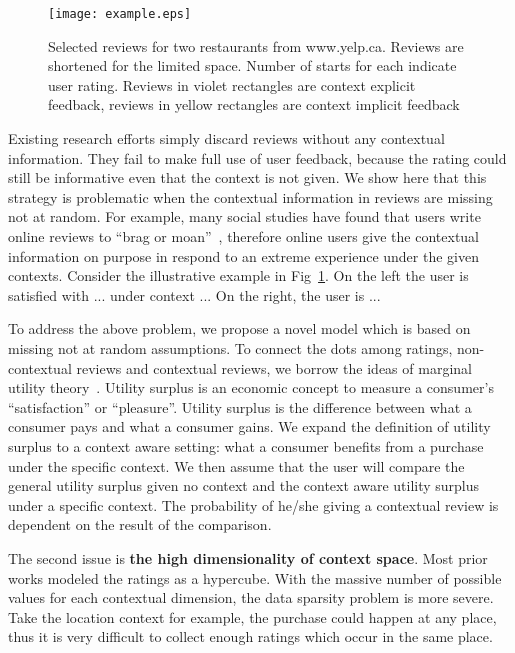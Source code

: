 \documentclass{llncs}
\begin{document}
\begin{figure}[!ht]
\label{fig:example}
\centering
\texttt{[image: example.eps]}
\caption{Selected reviews for two restaurants from www.yelp.ca. Reviews are shortened for the limited space. Number of starts for each indicate user rating. Reviews in violet rectangles are context explicit feedback, reviews in yellow rectangles are context implicit feedback}
\end{figure}

Existing research efforts simply discard reviews without any contextual information. They fail to make full use of user feedback, because the rating could still be informative even that the context is not given. We  show here that this strategy is problematic when the contextual information in reviews are missing not at random.  For example, many social studies have found that users write online reviews to ``brag or moan''~\cite{}, therefore online users give the contextual information on purpose in respond to an extreme experience under the given contexts. Consider the illustrative example in Fig~\ref{fig:example}. On the left  the user is satisfied with ... under context ... On the right, the user is ...

To address the above problem, we propose a novel model which is based on missing not at random assumptions. To connect the dots among ratings, non-contextual reviews and contextual reviews, we borrow the ideas of marginal utility theory~\cite{samuelson1937note}. Utility surplus is an economic concept to measure a consumer's ``satisfaction'' or ``pleasure''. Utility surplus is the difference between what a consumer pays and what a consumer gains. We expand the definition of utility surplus to a context aware setting: what a consumer benefits from a purchase under the specific context. We then assume that the user will compare the general utility surplus given no context and the context aware utility surplus under a specific context. The probability of he/she giving a contextual review is dependent on the result of the comparison.

The second issue is \textbf{the high dimensionality of context space}. Most prior works modeled the ratings as a hypercube. With the massive number of possible values for each contextual dimension, the data sparsity problem is more severe. Take the location context for example, the purchase could happen at any place, thus it is very difficult to collect enough  ratings which occur in the same place. 
\end{document}
